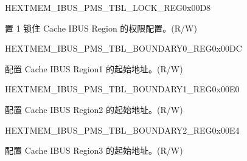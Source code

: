 \begin{register}{H}{EXTMEM\_IBUS\_PMS\_TBL\_LOCK\_REG}{0x00D8}\label{regdesc:EXTMEMIBUSPMSTBLLOCKREG}
%
%
\regnewline%
\begin{regdesc}\begin{reglist}
\label{fielddesc:EXTMEMIBUSPMSLOCK}\item [EXTMEM\_IBUS\_PMS\_LOCK] 置 1 锁住 Cache IBUS Region 的权限配置。(R/W)
\end{reglist}\end{regdesc}
\end{register}


\begin{register}{H}{EXTMEM\_IBUS\_PMS\_TBL\_BOUNDARY0\_REG}{0x00DC}\label{regdesc:EXTMEMIBUSPMSTBLBOUNDARY0REG}
%
%
\regnewline%
\begin{regdesc}\begin{reglist}
\label{fielddesc:EXTMEMIBUSPMSBOUNDARY0}\item [EXTMEM\_IBUS\_PMS\_BOUNDARY0] 配置 Cache IBUS Region1 的起始地址。(R/W)
\end{reglist}\end{regdesc}
\end{register}


\begin{register}{H}{EXTMEM\_IBUS\_PMS\_TBL\_BOUNDARY1\_REG}{0x00E0}\label{regdesc:EXTMEMIBUSPMSTBLBOUNDARY1REG}
%
%
\regnewline%
\begin{regdesc}\begin{reglist}
\label{fielddesc:EXTMEMIBUSPMSBOUNDARY1}\item [EXTMEM\_IBUS\_PMS\_BOUNDARY1] 配置 Cache IBUS Region2 的起始地址。(R/W)
\end{reglist}\end{regdesc}
\end{register}


\begin{register}{H}{EXTMEM\_IBUS\_PMS\_TBL\_BOUNDARY2\_REG}{0x00E4}\label{regdesc:EXTMEMIBUSPMSTBLBOUNDARY2REG}
%
%
\regnewline%
\begin{regdesc}\begin{reglist}
\label{fielddesc:EXTMEMIBUSPMSBOUNDARY2}\item [EXTMEM\_IBUS\_PMS\_BOUNDARY2] 配置 Cache IBUS Region3 的起始地址。(R/W)
\end{reglist}\end{regdesc}
\end{register}


